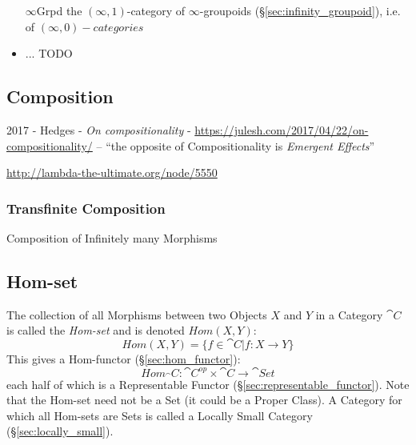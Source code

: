 \begin{itemize}
\item [$\infty$Grpd] the $(\infty,1)$-category of $\infty$-groupoids
  (\S\ref{sec:infinity_groupoid}), i.e. of $(\infty,0)-categories$
\item ... TODO
\end{itemize}



\subsection{Composition}\label{sec:composition}

2017 - Hedges - \emph{On compositionality} -
\url{https://julesh.com/2017/04/22/on-compositionality/} -- ``the opposite of
Compositionality is \emph{Emergent Effects}''

\url{http://lambda-the-ultimate.org/node/5550}



\subsubsection{Transfinite Composition}
\label{sec:transfinite_composition}

Composition of Infinitely many Morphisms



\subsection{Hom-set}\label{sec:hom_set}

The collection of all Morphisms between two Objects $X$ and $Y$ in a
Category $\cat{C}$ is called the \emph{Hom-set} and is denoted
$Hom(X,Y)$:
\[
  Hom(X,Y) = \{f \in \cat{C} | f : X \rightarrow Y\}
\]
This gives a Hom-functor (\S\ref{sec:hom_functor}):
\[
  Hom_\cat{C} : \cat{C^{op}} \times \cat{C} \rightarrow \cat{Set}
\]
each half of which is a Representable Functor
(\S\ref{sec:representable_functor}).
\newline
\fist Note that the Hom-set need not be a Set (it could be a
Proper Class). A Category for which all Hom-sets are Sets is called a
Locally Small Category (\S\ref{sec:locally_small}).

